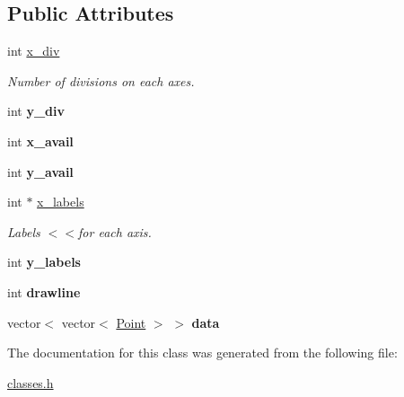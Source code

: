 \subsection*{Public Attributes}
\begin{DoxyCompactItemize}
\item 
\hypertarget{classGraph_afe133cc33b87353c3214cc87ed4e13a1}{
int \hyperlink{classGraph_afe133cc33b87353c3214cc87ed4e13a1}{x\_\-div}}
\label{classGraph_afe133cc33b87353c3214cc87ed4e13a1}

\begin{DoxyCompactList}\small\item\em Number of divisions on each axes. \item\end{DoxyCompactList}\item 
\hypertarget{classGraph_a987324753b4dd07f29ab316cc0b936b8}{
int {\bfseries y\_\-div}}
\label{classGraph_a987324753b4dd07f29ab316cc0b936b8}

\item 
\hypertarget{classGraph_ab92f0b2899b3b26d00bee780885f84ac}{
int {\bfseries x\_\-avail}}
\label{classGraph_ab92f0b2899b3b26d00bee780885f84ac}

\item 
\hypertarget{classGraph_af6af17cb500e1a2507ab8876cc7b8e10}{
int {\bfseries y\_\-avail}}
\label{classGraph_af6af17cb500e1a2507ab8876cc7b8e10}

\item 
\hypertarget{classGraph_ac3b302755470c4a41222a02d2316d659}{
int $\ast$ \hyperlink{classGraph_ac3b302755470c4a41222a02d2316d659}{x\_\-labels}}
\label{classGraph_ac3b302755470c4a41222a02d2316d659}

\begin{DoxyCompactList}\small\item\em Labels $<$$<$for each axis. \item\end{DoxyCompactList}\item 
\hypertarget{classGraph_a01465c6a7e9ae4b0143f31325d713321}{
int {\bfseries y\_\-labels}}
\label{classGraph_a01465c6a7e9ae4b0143f31325d713321}

\item 
\hypertarget{classGraph_a0672f235927c8e2e6a79892d1122f81c}{
int {\bfseries drawline}}
\label{classGraph_a0672f235927c8e2e6a79892d1122f81c}

\item 
\hypertarget{classGraph_a08225025f20ee79eb53c91d677900944}{
vector$<$ vector$<$ \hyperlink{classPoint}{Point} $>$ $>$ {\bfseries data}}
\label{classGraph_a08225025f20ee79eb53c91d677900944}

\end{DoxyCompactItemize}


The documentation for this class was generated from the following file:\begin{DoxyCompactItemize}
\item 
\hyperlink{classes_8h}{classes.h}\end{DoxyCompactItemize}
